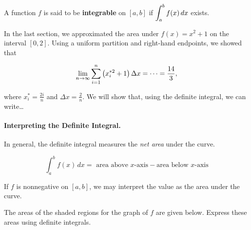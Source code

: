 \documentclass[12pt]{article}
\begin{document}
\vspace{5mm}

A function $f$ is said to be \textbf{integrable} on $[a,b]$ if $\displaystyle\int_a^b f(x)\,dx$ exists.

\vspace{5mm}


\newpage

In the last section, we approximated the area under $f(x)=x^2+1$ on the interval $[0,2]$. Using a uniform partition and right-hand endpoints, we showed that

$$\lim_{n\to\infty}\sum_{i=1}^n\left( x_i^{*2}+1\right)\Delta x=\dots=\frac{14}{3},$$

where $x_i^*=\frac{2i}{n}$ and $\Delta x=\frac{2}{n}$. We will show that, using the definite integral, we can write\dots

\vspace{20mm}

\paragraph{Interpreting the Definite Integral.} In general, the definite integral measures the \textit{net area} under the curve.

$$\int_a^b f(x)\,dx=\text{ area above $x$-axis} - \text{area below $x$-axis}$$

\vspace{3mm}

If $f$ is nonnegative on $[a,b]$, we may interpret the value as the area under the curve.

\vspace{5mm}

\Example The areas of the shaded regions for the graph of $f$ are given below. Express these areas using definite integrals.

\vspace{5mm}
\end{document}
